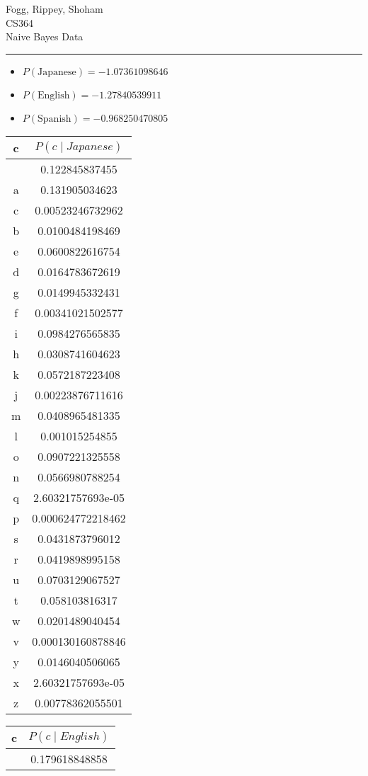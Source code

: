 \documentclass{article}
\renewcommand{\maketitle}{
  \begin{center}
    \begin{flushright}
      Fogg, Rippey, Shoham \\
      CS364 \\
      Naive Bayes Data
    \end{flushright}
    \rule{\linewidth}{0.1mm}
  \end{center}
}
\begin{document}
\maketitle\begin{itemize}
\item $P(\text{Japanese}) = -1.07361098646$ 
\item $P(\text{English}) = -1.27840539911$ 
\item $P(\text{Spanish}) = -0.968250470805$ 
\end{itemize}
\begin{center}
\begin{tabular}{c|c}
c & $P(c \mid Japanese)$ \\ \hline  & 0.122845837455 \\
a & 0.131905034623 \\
c & 0.00523246732962 \\
b & 0.0100484198469 \\
e & 0.0600822616754 \\
d & 0.0164783672619 \\
g & 0.0149945332431 \\
f & 0.00341021502577 \\
i & 0.0984276565835 \\
h & 0.0308741604623 \\
k & 0.0572187223408 \\
j & 0.00223876711616 \\
m & 0.0408965481335 \\
l & 0.001015254855 \\
o & 0.0907221325558 \\
n & 0.0566980788254 \\
q & 2.60321757693e-05 \\
p & 0.000624772218462 \\
s & 0.0431873796012 \\
r & 0.0419898995158 \\
u & 0.0703129067527 \\
t & 0.058103816317 \\
w & 0.0201489040454 \\
v & 0.000130160878846 \\
y & 0.0146040506065 \\
x & 2.60321757693e-05 \\
z & 0.00778362055501 \\
\end{tabular}
\begin{tabular}{c|c}
c & $P(c \mid English)$ \\ \hline  & 0.179618848858 \\

\end{tabular}
\end{center}
\end{document}
